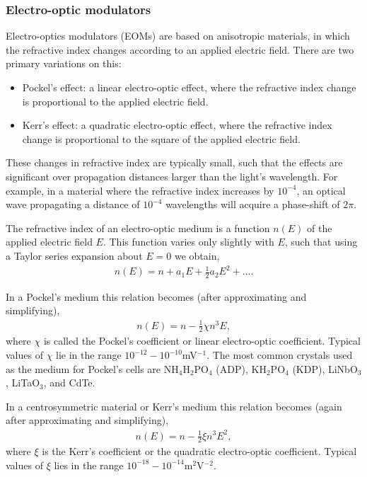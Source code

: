 \subsubsection{Electro-optic modulators} 

Electro-optics modulators (EOMs) are based on anisotropic materials, in which the refractive index changes according to an applied electric field. There are two primary variations on this:
\begin{itemize}
	\item Pockel's effect: a linear electro-optic effect, where the refractive index change is proportional to the applied electric field.
	\item Kerr's effect: a quadratic electro-optic effect, where the refractive index change is proportional to the square of the applied electric field.
\end{itemize}

These changes in refractive index are typically small, such that the effects are significant over propagation distances larger than the light's wavelength. For example, in a material where the refractive index increases by $10^{-4}$, an optical wave propagating a distance of $10^{-4}$ wavelengths will acquire a phase-shift of $2\pi$.

The refractive index of an electro-optic medium is a function $n(E)$ of the applied electric field $E$. This function varies only slightly with $E$, such that using a Taylor series expansion about \mbox{$E=0$} we obtain,
\begin{align}
n(E) = n+a_1E + \frac{1}{2}a_2E^2+\dots.
\end{align}

In a Pockel's medium this relation becomes (after approximating and simplifying),
\begin{align}
n(E) = n-\frac{1}{2}\chi n^3 E,
\end{align}
where $\chi$ is called the Pockel's coefficient or linear electro-optic coefficient. Typical values of $\chi$ lie in the range $10^{-12}-10^{-10}$mV$^{-1}$. The most common crystals used as the medium for Pockel's cells are NH$_4$H$_2$PO$_4$ (ADP), KH$_2$PO$_4$ (KDP), LiNbO$_3$, LiTaO$_3$, and CdTe.

In a centrosymmetric material or Kerr's medium this relation becomes (again after approximating and simplifying),
\begin{align}
n(E) = n-\frac{1}{2}\xi n^3 E^2,
\end{align}
where $\xi$ is the Kerr's coefficient or the quadratic electro-optic coefficient. Typical values of $\xi$ lies in the range $10^{-18}-10^{-14}$m$^2$V$^{-2}$.

